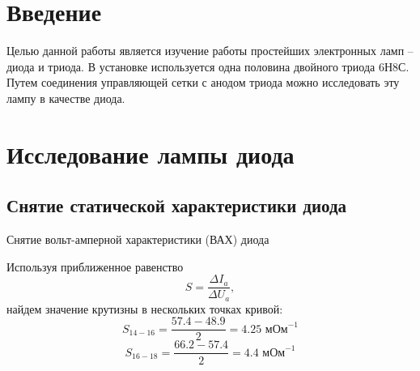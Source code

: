 \documentclass[a4paper,12pt]{extarticle}%
\def\source{/home/osabio/tex/templates}
\begin{document}

\tableofcontents
\newpage

\section*{Введение} %
\label{sec:input}

Целью данной работы является изучение работы простейших электронных ламп -- диода и триода. В установке используется одна половина двойного триода 6Н8С. Путем соединения управляющей сетки с анодом триода можно исследовать эту лампу в качестве диода. 

\newpage
\section{Исследование лампы диода}
\subsection{Снятие статической характеристики диода}

\begin{table}[H]
	    \caption{Снятие вольт-амперной характеристики (ВАХ) диода}
  \begin{minipage}{.35\textwidth}
	  \begin{center}
	    \label{tab:diod}
	  \end{center}
  \end{minipage} %
    \begin{minipage}{.6\textwidth}
    \centering
    
  \end{minipage}
	\end{table}

Используя приближенное равенство
\begin{equation}
	S=\frac{\Delta I_a}{\Delta U_a},
\end{equation}
найдем значение крутизны в нескольких точках кривой:
\begin{equation}
	S_{14-16}=\frac{57.4-48.9}{2}=4.25 \text{ мОм}^{-1}
\end{equation}
\begin{equation}
	S_{16-18}=\frac{66.2-57.4}{2}=4.4 \text{ мОм}^{-1}
\end{equation}
\end{document}
